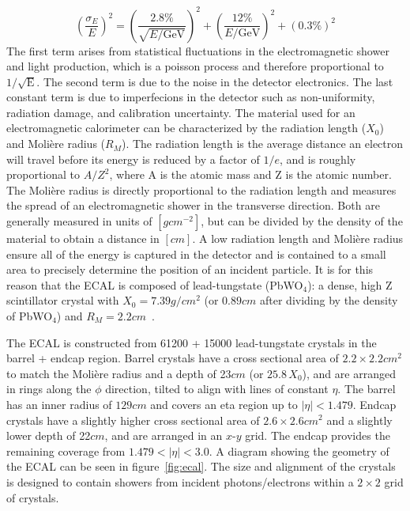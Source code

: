 \begin{equation}
	\left(\frac{\sigma_E}{E}\right)^2=\left(\frac{2.8\%}{\sqrt{E/\mathrm{GeV}}}\right)^2+\left(\frac{12\%}{E/\mathrm{GeV}}\right)^2+(0.3\%)^2
\end{equation}
The first term arises from statistical fluctuations in the electromagnetic shower and light production, which is a poisson process and therefore proportional to $1/\sqrt{\mathrm{E}}$. The second term is due to the noise in the detector electronics. The last constant term is due to imperfecions in the detector such as non-uniformity, radiation damage, and calibration uncertainty.
The material used for an electromagnetic calorimeter can be characterized by the radiation length ($X_0$) and Moli\`ere radius ($R_M$). The radiation length is the average distance an electron will travel before its energy is reduced by a factor of $1/e$, and is roughly proportional to $A/Z^2$, where A is the atomic mass and Z is the atomic number. The Moli\`ere radius is directly proportional to the radiation length and measures the spread of an electromagnetic shower in the transverse direction. Both are generally measured in units of $\left[\si{g}\unit{cm^{-2}}\right]$, but can be divided by the density of the material to obtain a distance in $\left[\si{cm}\right]$. A low radiation length and Moli\`ere radius ensure all of the energy is captured in the detector and is contained to a small area to precisely determine the position of an incident particle. It is for this reason that the ECAL is composed of lead-tungstate (PbWO$_4$): a dense, high Z scintillator crystal with $X_0=7.39\unit{g/cm^2}$ (or $0.89\unit{cm}$ after dividing by the density of PbWO$_4$) and $R_M=2.2\unit{cm}$~\cite{Workman:2022ynf}.

The ECAL is constructed from 61200 + 15000 lead-tungstate crystals in the barrel + endcap region. Barrel crystals have a cross sectional area of $2.2\times2.2\unit{cm^2}$ to match the Moli\`ere radius and a depth of 23$\unit{cm}$ (or $25.8\,X_0$), and are arranged in rings along the $\phi$ direction, tilted to align with lines of constant $\eta$. The barrel has an inner radius of $129\unit{cm}$ and covers an eta region up to $\left|\eta\right|<1.479$. Endcap crystals have a slightly higher cross sectional area of $2.6\times2.6\unit{cm^2}$ and a slightly lower depth of 22$\unit{cm}$, and are arranged in an $x$-$y$ grid. The endcap provides the remaining coverage from $1.479<\left|\eta\right|<3.0$. A diagram showing the geometry of the ECAL can be seen in figure~\ref{fig:ecal}. The size and alignment of the crystals is designed to contain showers from incident photons/electrons within a $2\times2$ grid of crystals.

